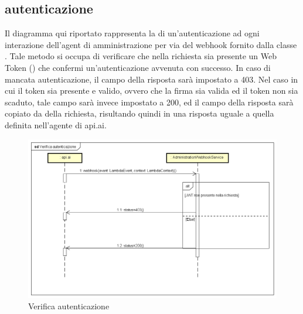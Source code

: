 \subsection{ autenticazione}
Il diagramma qui riportato rappresenta la  di un'autenticazione ad ogni interazione dell'agent di amministrazione per via del webhook fornito dalla classe . Tale metodo si occupa di verificare che nella richiesta sia presente un  Web Token () che confermi un'autenticazione avvenuta con successo. In caso di mancata autenticazione, il campo  della risposta sarà impostato a 403. Nel caso in cui il token sia presente e valido, ovvero che la firma sia valida ed il token non sia scaduto, tale campo sarà invece impostato a 200, ed il campo  della risposta sarà copiato da  della richiesta, risultando quindi in una risposta uguale a quella definita nell'agente di api.ai.
 \begin{figure}[h] \centering \includegraphics[width=\textwidth,height=\textheight,keepaspectratio]{images/diagrams/back-end/Ufficial_Backend/Verificaautenticazione.png} 	\caption{Verifica autenticazione}
\end{figure}
\newpage


